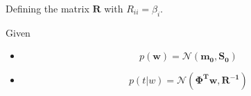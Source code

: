 \documentclass[reqno]{amsart}
\begin{document}
\begin{enumerate}[label=\textbf{(\Roman*)}]
        Defining the matrix \(\mathbf{R}\) with \(R_{ii} = \beta_i\).




        



        Given \begin{itemize}
            \item \[p(\mathbf{w}) = \mathcal{N}(\mathbf{m_0, S_0})\]
            \item \[p(t|w) = \mathcal{N}(\mathbf{\Phi^T w, R^{-1}})\]
        \end{itemize}


\end{enumerate}
\end{document}
